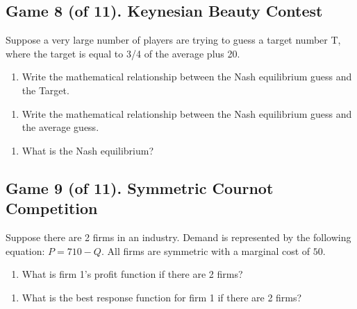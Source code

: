 \documentclass[11pt]{article}
\begin{document}
\pagebreak

\subsection*{Game 8 (of 11). Keynesian Beauty Contest 
}

Suppose a very large number of players are trying to guess a target number T, where the target is equal to 3/4 of the average plus 20.  

\begin{enumerate}[label=\alph*), start=1]
\item  Write the mathematical relationship between the Nash equilibrium guess and the Target. 

\end{enumerate}
\hfill \raisebox{-1ex}{\rule{4.2cm}{1pt}}

\begin{enumerate}[label=\alph*), start=2]
\item  Write the mathematical relationship between the Nash equilibrium guess and the average guess. 

\end{enumerate}
\hfill \raisebox{-1ex}{\rule{4.2cm}{1pt}}

\begin{enumerate}[label=\alph*), start=3]
\item  What is the Nash equilibrium? \hfill \raisebox{-1ex}{\rule{4.2cm}{1pt}}

\end{enumerate}

\subsection*{Game 9 (of 11). Symmetric Cournot Competition
}
Suppose there are 2 firms in an industry. Demand is represented by the following equation:  
$P = 710 - Q$. All firms are symmetric with a marginal cost of $50$. 

\begin{enumerate}[label=\alph*), start=1]
\item  What is firm 1’s profit function if there are 2 firms? \hfill \raisebox{-1ex}{\rule{4.2cm}{1pt}}

\end{enumerate}
\vspace{1cm}

\begin{enumerate}[label=\alph*), start=2]
\item  What is the best response function for firm 1 if there are 2 firms? \hfill \raisebox{-1ex}{\rule{4.2cm}{1pt}}

\end{enumerate}
\vspace{1cm}
\end{document}
